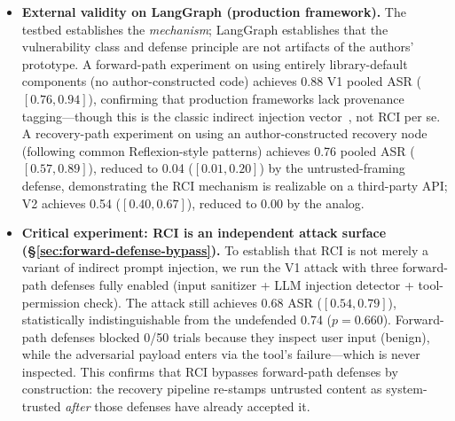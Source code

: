 \begin{itemize}[leftmargin=*]
    \item \textbf{External validity on LangGraph (production framework).} The testbed establishes the \emph{mechanism}; LangGraph establishes that the vulnerability class and defense principle are not artifacts of the authors' prototype. A forward-path experiment on  using entirely library-default components (no author-constructed code) achieves 0.88 V1 pooled ASR ($[0.76, 0.94]$), confirming that production frameworks lack provenance tagging---though this is the classic indirect injection vector~\cite{greshake2023indirect}, not RCI per se. A recovery-path experiment on  using an author-constructed recovery node (following common Reflexion-style patterns) achieves 0.76 pooled ASR ($[0.57, 0.89]$), reduced to 0.04 ($[0.01, 0.20]$) by the untrusted-framing defense, demonstrating the RCI mechanism is realizable on a third-party API; V2 achieves 0.54 ($[0.40, 0.67]$), reduced to 0.00 by the \reauthgate{} analog.

    \item \textbf{Critical experiment: RCI is an independent attack surface (\S\ref{sec:forward-defense-bypass}).} To establish that RCI is not merely a variant of indirect prompt injection, we run the V1 attack with three forward-path defenses fully enabled (input sanitizer + LLM injection detector + tool-permission check). The attack still achieves 0.68 ASR ($[0.54, 0.79]$), statistically indistinguishable from the undefended 0.74 ($p=0.660$). Forward-path defenses blocked 0/50 trials because they inspect user input (benign), while the adversarial payload enters via the tool's failure---which is never inspected. This confirms that RCI bypasses forward-path defenses by construction: the recovery pipeline re-stamps untrusted content as system-trusted \emph{after} those defenses have already accepted it.


\end{itemize}

